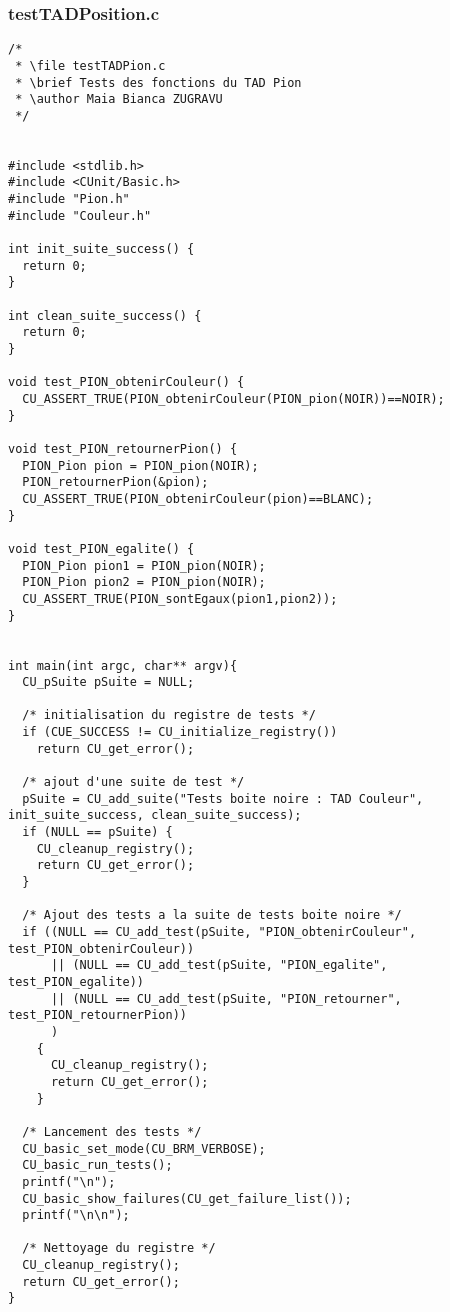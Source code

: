 \subsubsection{testTADPosition.c}
\begin{lstlisting}
/*
 * \file testTADPion.c
 * \brief Tests des fonctions du TAD Pion
 * \author Maia Bianca ZUGRAVU
 */


#include <stdlib.h>
#include <CUnit/Basic.h>
#include "Pion.h"
#include "Couleur.h"

int init_suite_success() {
  return 0;
}

int clean_suite_success() {
  return 0;
}

void test_PION_obtenirCouleur() {
  CU_ASSERT_TRUE(PION_obtenirCouleur(PION_pion(NOIR))==NOIR);
}

void test_PION_retournerPion() {
  PION_Pion pion = PION_pion(NOIR);
  PION_retournerPion(&pion);
  CU_ASSERT_TRUE(PION_obtenirCouleur(pion)==BLANC);
}

void test_PION_egalite() {
  PION_Pion pion1 = PION_pion(NOIR);
  PION_Pion pion2 = PION_pion(NOIR);
  CU_ASSERT_TRUE(PION_sontEgaux(pion1,pion2));
}


int main(int argc, char** argv){
  CU_pSuite pSuite = NULL;

  /* initialisation du registre de tests */
  if (CUE_SUCCESS != CU_initialize_registry())
    return CU_get_error();

  /* ajout d'une suite de test */
  pSuite = CU_add_suite("Tests boite noire : TAD Couleur", init_suite_success, clean_suite_success);
  if (NULL == pSuite) {
    CU_cleanup_registry();
    return CU_get_error();
  }

  /* Ajout des tests a la suite de tests boite noire */
  if ((NULL == CU_add_test(pSuite, "PION_obtenirCouleur", test_PION_obtenirCouleur))
      || (NULL == CU_add_test(pSuite, "PION_egalite", test_PION_egalite))
      || (NULL == CU_add_test(pSuite, "PION_retourner", test_PION_retournerPion))
      )
    {
      CU_cleanup_registry();
      return CU_get_error();
    }

  /* Lancement des tests */
  CU_basic_set_mode(CU_BRM_VERBOSE);
  CU_basic_run_tests();
  printf("\n");
  CU_basic_show_failures(CU_get_failure_list());
  printf("\n\n");

  /* Nettoyage du registre */
  CU_cleanup_registry();
  return CU_get_error();
}
\end{lstlisting}


